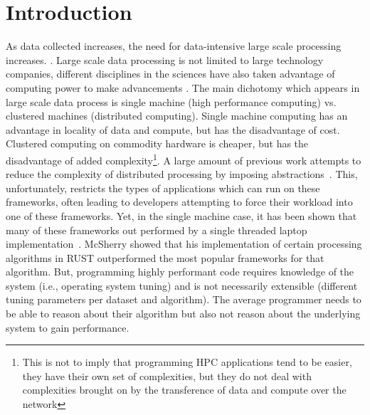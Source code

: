 \section{Introduction} 
\label{sec:intro}

As data collected increases, the need for data-intensive large scale processing
increases. . Large scale
data processing is not limited to large technology companies, different
disciplines in the sciences have also taken advantage of computing power to make
advancements . 
The main dichotomy
which appears in large scale data process is single machine (high performance
computing) vs. clustered machines (distributed computing). Single machine
computing has an advantage in locality of data and compute, but has the
disadvantage of cost. Clustered computing on commodity hardware is cheaper, but
has the disadvantage of added complexity\footnote{This is not to imply that
programming HPC applications tend to be easier, they have their own set of
complexities, but they do not deal with complexities brought on by the
transference of data and compute over the network}. 
A large amount of previous work attempts to reduce the complexity of
distributed processing by imposing abstractions~\cite{Dean2004,Low2010,Murray2013}.
This, unfortunately, restricts the types of applications which can run on these
frameworks, often leading to developers attempting to force their workload into
one of these frameworks. 
Yet, in the single machine case, it has been shown that
many of these frameworks out performed by a single threaded laptop
implementation~\cite{COST}. McSherry showed that his implementation of certain
processing algorithms in RUST outperformed the most popular frameworks for that
algorithm. But, programming highly performant code requires knowledge of the
system (i.e., operating system tuning) and is not necessarily extensible 
(different tuning parameters per dataset and algorithm). The average programmer
needs to be able to reason about their algorithm but also not reason
about the underlying system to gain performance. 

